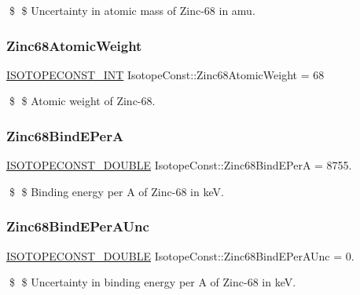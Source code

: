 \$ \$ Uncertainty in atomic mass of Zinc-\/68 in amu. \mbox{\label{group___isotope_const-_zinc-_zn68_gae20e216f2e1473d3dc6344dc316ce099}} 
\subsubsection{\texorpdfstring{Zinc68\+Atomic\+Weight}{Zinc68AtomicWeight}}
{\footnotesize\ttfamily \mbox{\hyperlink{group___isotope_const-_macros_ga5f18360b3e99483a35c32d789e62621c}{I\+S\+O\+T\+O\+P\+E\+C\+O\+N\+S\+T\+\_\+\+I\+NT}} Isotope\+Const\+::\+Zinc68\+Atomic\+Weight = 68}

\$ \$ Atomic weight of Zinc-\/68. \mbox{\label{group___isotope_const-_zinc-_zn68_ga0b900079262ca53709317b2db9317b9e}} 
\subsubsection{\texorpdfstring{Zinc68\+Bind\+E\+PerA}{Zinc68BindEPerA}}
{\footnotesize\ttfamily \mbox{\hyperlink{group___isotope_const-_macros_ga8f45a7272ce02c0b4c65c44636ed719a}{I\+S\+O\+T\+O\+P\+E\+C\+O\+N\+S\+T\+\_\+\+D\+O\+U\+B\+LE}} Isotope\+Const\+::\+Zinc68\+Bind\+E\+PerA = 8755.}

\$ \$ Binding energy per A of Zinc-\/68 in keV. \mbox{\label{group___isotope_const-_zinc-_zn68_ga4bc280f9d8d37736040c81feb5f9564f}} 
\subsubsection{\texorpdfstring{Zinc68\+Bind\+E\+Per\+A\+Unc}{Zinc68BindEPerAUnc}}
{\footnotesize\ttfamily \mbox{\hyperlink{group___isotope_const-_macros_ga8f45a7272ce02c0b4c65c44636ed719a}{I\+S\+O\+T\+O\+P\+E\+C\+O\+N\+S\+T\+\_\+\+D\+O\+U\+B\+LE}} Isotope\+Const\+::\+Zinc68\+Bind\+E\+Per\+A\+Unc = 0.}

\$ \$ Uncertainty in binding energy per A of Zinc-\/68 in keV. \mbox{\label{group___isotope_const-_zinc-_zn68_ga3e95955d16e8d490eff433e8cdfdcff9}} 
